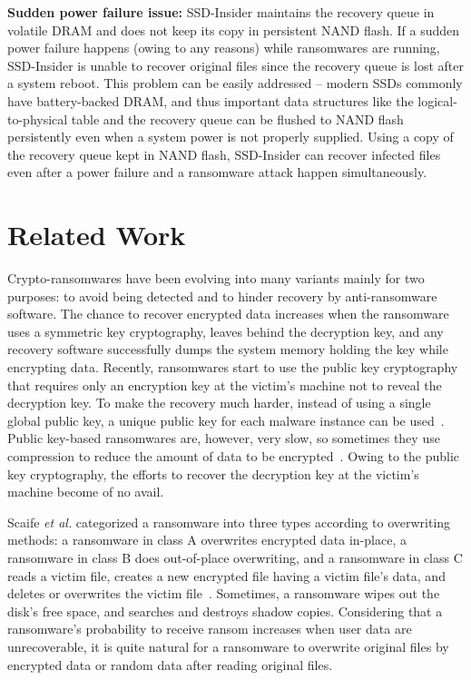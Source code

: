 \documentclass[conference]{IEEEtran}
\newcommand{\etal}{{\it et al.}\xspace}
\newcommand{\ours}{SSD-Insider}
\begin{document}
{\bf Sudden power failure issue:}
\ours{} maintains the recovery queue in volatile DRAM and does
not keep its copy in persistent NAND flash. If a sudden power
failure happens (owing to any reasons) while ransomwares are
running, \ours{} is unable to recover original files since the
recovery queue is lost after a system reboot.  This problem can be
easily addressed -- modern SSDs commonly have battery-backed DRAM,
and thus important data structures like the logical-to-physical
table and the recovery queue can be flushed to NAND flash
persistently even when a system power is not properly supplied.
Using a copy of the recovery queue kept in NAND flash, \ours{}
can recover infected files even after a power failure and a
ransomware attack happen simultaneously.


\section{Related Work}

Crypto-ransomwares have been evolving into many variants mainly for
two purposes: to avoid being detected and to hinder recovery by
anti-ransomware software.  The chance to recover encrypted data
increases when the ransomware uses a symmetric key cryptography,
leaves behind the decryption key, and any recovery software
successfully dumps the system memory holding the key while
encrypting data. Recently, ransomwares start to use the public key
cryptography that requires only an encryption key at the victim's
machine not to reveal the decryption key.  To make the recovery
much harder, instead of using a single global public key, a unique
public key for each malware instance can be used~\cite{orman16}.
Public key-based ransomwares are, however, very slow, so sometimes
they use compression to reduce the amount of data to be
encrypted~\cite{maktub}.  Owing to the public key cryptography, the
efforts to recover the decryption key at the victim's machine
become of no avail.

Scaife \etal categorized a ransomware into three types according to
overwriting methods: a ransomware in class A overwrites encrypted
data in-place, a ransomware in class B does out-of-place
overwriting, and a ransomware in class C reads a victim file,
creates a new encrypted file having a victim file's data, and
deletes or overwrites the victim file~\cite{scaife16}.  Sometimes,
a ransomware wipes out the disk's free space, and searches and
destroys shadow copies.  Considering that a ransomware's
probability to receive ransom increases when user data are
unrecoverable, it is quite natural for a ransomware to overwrite
original files by encrypted data or random data after reading
original files. 
\end{document}
